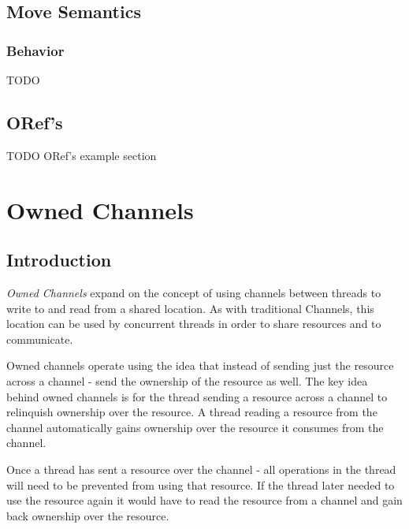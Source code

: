 \documentclass[onehalf,11pt]{beavtex}
\begin{document}
\section{Move Semantics}

\subsection{Behavior}

TODO


\section{ORef's}

TODO ORef's example section


\chapter{Owned Channels}

\section{Introduction}

\textit{Owned Channels} expand on the concept of using channels between threads
to write to and read from a shared location.   As with traditional Channels,
this location can be used by concurrent threads in order to share resources and
to communicate.


Owned channels operate using the idea that instead of sending just the
resource across a channel - send the ownership of the resource as well.
The key idea behind owned channels is for the thread sending a
resource across a channel to relinquish ownership over the resource.
A thread reading a resource from the channel automatically gains ownership over
the resource it consumes from the channel.

Once a thread has sent a resource over the channel - all operations in the thread
will need to be prevented from using that resource.
If the thread later needed to use the resource again it would have to read the
resource from a channel and gain back ownership over the resource.
\end{document}
